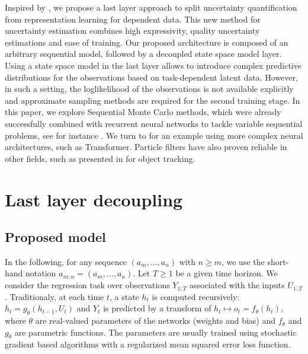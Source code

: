 \documentclass{article}
\begin{document}
Inspired by  \cite{Brosse2020OnLA}, we propose a last layer approach to split uncertainty quantification from representation learning for dependent data.  This new method for uncertainty estimation combines high expressivity, quality uncertainty estimations and ease of training. Our proposed architecture is composed of an arbitrary sequential model, followed by a decoupled state space model layer. Using a state space model in the last layer allows to introduce complex predictive distributions for the observations based on task-dependent latent data. However, in such a setting, the loglikelihood of the observations is not available explicitly and approximate sampling methods are required for the second training stage.   In this paper, we explore Sequential Monte Carlo methods, which were already successfully combined with recurrent neural networks to tackle variable sequential problems, see for instance \cite{Ma2020}.
We turn to \cite{Martin2020TheMC} for an example using more complex neural architectures, such as Transformer.
Particle filters have also proven reliable in other fields, such as presented in \cite{Liu2020LSTMPF} for object tracking.




\section{Last layer decoupling}
\label{sec:decoupling}

\subsection{Proposed model}%
\label{sub:proposed_architecture}

In the following, for any sequence $(a_m,\ldots, a_n)$ with $n\geq m$, we use the short-hand notation $a_{m:n} = (a_m,\ldots, a_n)$.
Let $T\ge 1$ be a given time horizon.
We consider the regression task over observations $Y_{1:T}$ associated with the inputs $U_{1:T}$.
Traditionaly, at each time $t$, a state $h_t$ is computed recursively: $h_t = g_\theta(h_{t-1},U_t)$ and $Y_t$ is predicted by a transform of $h_t \mapsto o_t = f_\theta(h_t)$, where $\theta$ are real-valued parameters of the networks (weights and bias) and $f_\theta$ and $g_\theta$ are parametric functions.
The parameters are usually trained using stochastic gradient based algorithms with a regularized mean squared error loss function.
\end{document}
